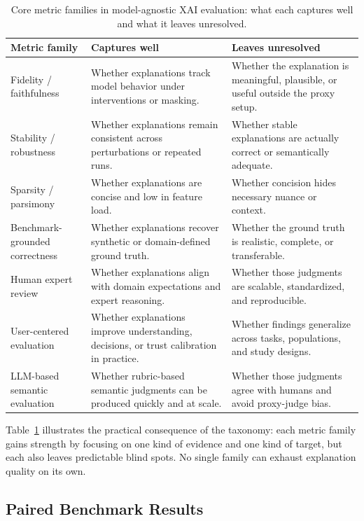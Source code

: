 \documentclass[10pt,a4paper,twoside]{article}
\begin{document}
\begin{table}[t]
\centering
\caption{Core metric families in model-agnostic XAI evaluation: what
each captures well and what it leaves unresolved.}
\footnotesize
\begin{tabularx}{\linewidth}{l X X}
\toprule
\textbf{Metric family} & \textbf{Captures well} & \textbf{Leaves unresolved} \\
\midrule
Fidelity / faithfulness & Whether explanations track model behavior under interventions or masking. & Whether the explanation is meaningful, plausible, or useful outside the proxy setup. \\
Stability / robustness & Whether explanations remain consistent across perturbations or repeated runs. & Whether stable explanations are actually correct or semantically adequate. \\
Sparsity / parsimony & Whether explanations are concise and low in feature load. & Whether concision hides necessary nuance or context. \\
Benchmark-grounded correctness & Whether explanations recover synthetic or domain-defined ground truth. & Whether the ground truth is realistic, complete, or transferable. \\
Human expert review & Whether explanations align with domain expectations and expert reasoning. & Whether those judgments are scalable, standardized, and reproducible. \\
User-centered evaluation & Whether explanations improve understanding, decisions, or trust calibration in practice. & Whether findings generalize across tasks, populations, and study designs. \\
LLM-based semantic evaluation & Whether rubric-based semantic judgments can be produced quickly and at scale. & Whether those judgments agree with humans and avoid proxy-judge bias. \\
\bottomrule
\end{tabularx}
\label{tab:taxonomy_families}
\end{table}

Table~\ref{tab:taxonomy_families} illustrates the practical consequence of
the taxonomy: each metric family gains strength by focusing on one kind
of evidence and one kind of target, but each also leaves predictable
blind spots. No single family can exhaust explanation quality on its own.


\subsection{Paired Benchmark Results}
\label{sec:results}
\end{document}
